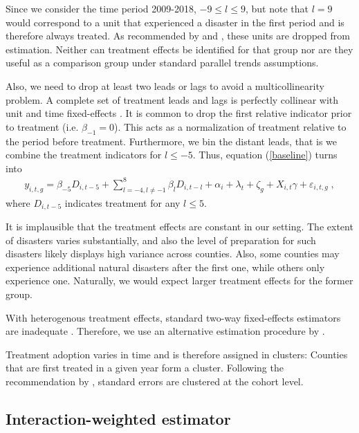 Since we consider the time period 2009-2018, $-9 \leq l \leq 9$, but note that $l = 9$ would correspond to a unit that experienced a disaster in the first period and is therefore always treated. As recommended by \cite{Sun_2021} and \cite{Callaway_2021}, these units are dropped from estimation. Neither can treatment effects be identified for that group nor are they useful as a comparison group under standard parallel trends assumptions.

Also, we need to drop at least two leads or lags to avoid a multicollinearity problem. A complete set of treatment leads and lags is perfectly collinear with unit and time fixed-effects \citep[for an extensive discussion of this issue see][section 3.2]{Borusyak_2021}. It is common to drop the first relative indicator prior to treatment (i.e. $\beta_{-1} = 0$). This acts as a normalization of treatment relative to the period before treatment. Furthermore, we bin the distant leads, that is we combine the treatment indicators for $l \leq -5$. Thus, equation (\ref{baseline}) turns into
\begin{align} \label{baselineBinned}
	y_{i, t, g} = \beta_{-5}  D_{i, t-5} + \sum_{l = -4, l \neq -1}^{8} \beta_l D_{i, t-l} + \alpha_i + \lambda_t + \zeta_g + X_{i, t} \gamma + \varepsilon_{i, t, g} \;,
\end{align}
where $D_{i, t-5}$ indicates treatment for any $l \leq 5$.

It is implausible that the treatment effects are constant in our setting. The extent of disasters varies substantially, and also the level of preparation for such disasters likely displays high variance across counties. Also, some counties may experience additional natural disasters after the first one, while others only experience one. Naturally, we would expect larger treatment effects for the former group.

With heterogenous treatment effects, standard two-way fixed-effects estimators are inadequate \citep{deChaisemartin_2020, deChaisemartin_2022, Sun_2021}. Therefore, we use an alternative estimation procedure by \cite{Sun_2021}.

Treatment adoption varies in time and is therefore assigned in clusters: Counties that are first treated in a given year form a cluster. Following the recommendation by \cite{Abadie_2017}, standard errors are clustered at the cohort level. 



\subsection{Interaction-weighted estimator}

